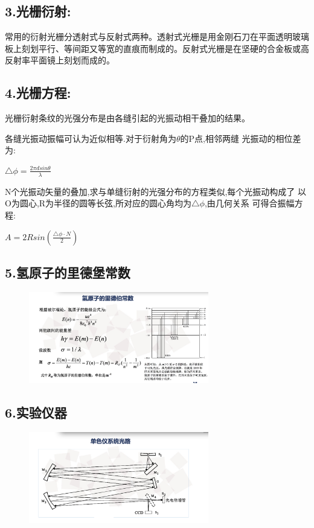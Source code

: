 \documentclass{article}
\begin{document}
\subsection*{3.光栅衍射:}
常用的衍射光栅分透射式与反射式两种。透射式光栅是用金刚石刀在平面透明玻璃板上刻划平行、等间距又等宽的直痕而制成的。反射式光栅是在坚硬的合金板或高反射率平面镜上刻划而成的。

\subsection*{4.光栅方程:}

光栅衍射条纹的光强分布是由各缝引起的光振动相干叠加的结果。

各缝光振动振幅可认为近似相等.对于衍射角为$\theta$的P点,相邻两缝
光振动的相位差为:

$\triangle\phi = \frac{2\pi d sin\theta}{\lambda}$

N个光振动矢量的叠加,求与单缝衍射的光强分布的方程类似,每个光振动构成了
以O为圆心,R为半径的圆等长弦,所对应的圆心角均为$\triangle\phi$,由几何关系
可得合振幅方程:

$A = 2Rsin(\frac{\triangle\phi\cdot N}{2})$

\subsection*{5.氢原子的里德堡常数}

\begin{figure}[H]
    \centering
    \includegraphics[width=0.7\textwidth]{2.png}
    \end{figure}


\subsection*{6.实验仪器}
\begin{figure}[H]
    \centering
    \includegraphics[width=0.7\textwidth]{3.png}
    \end{figure}
\end{document}
